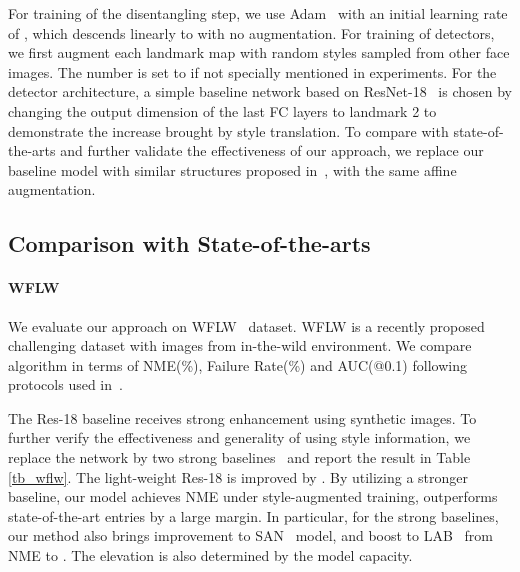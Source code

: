 \documentclass[10pt,twocolumn,letterpaper]{article}
\begin{document}
For training of the disentangling step, we use Adam~\cite{kingma2014adam} with an initial learning rate of , which descends linearly to  with no augmentation. For training of detectors, we first augment each landmark map with  random styles sampled from other face images. The number is set to  if not specially mentioned in experiments. For the detector architecture, a simple baseline network based on ResNet-18~\cite{he2016identity} is chosen by changing the output dimension of the last FC layers to landmark  2 to demonstrate the increase brought by style translation. To compare with state-of-the-arts and further validate the effectiveness of our approach, we replace our baseline model with similar structures proposed in~\cite{LAB,SAN}, with the same affine augmentation.

\subsection{Comparison with State-of-the-arts}

\paragraph{WFLW} We evaluate our approach on WFLW~\cite{LAB} dataset. WFLW is a recently proposed challenging dataset with images from in-the-wild environment. We compare algorithm in terms of NME(\%), Failure Rate(\%) and AUC(@0.1) following protocols used in~\cite{LAB}.

The Res-18 baseline receives strong enhancement using synthetic images. To further verify the effectiveness and generality of using style information, we replace the network by two strong baselines~\cite{SAN,LAB} and report the result in Table \ref{tb_wflw}. The light-weight Res-18 is improved by . By utilizing a stronger baseline, our model achieves  NME under style-augmented training, outperforms state-of-the-art entries by a large margin. In particular, for the strong baselines, our method also brings  improvement to SAN~\cite{SAN} model, and  boost to LAB~\cite{LAB} from  NME to . The elevation is also determined by the model capacity.
\end{document}
